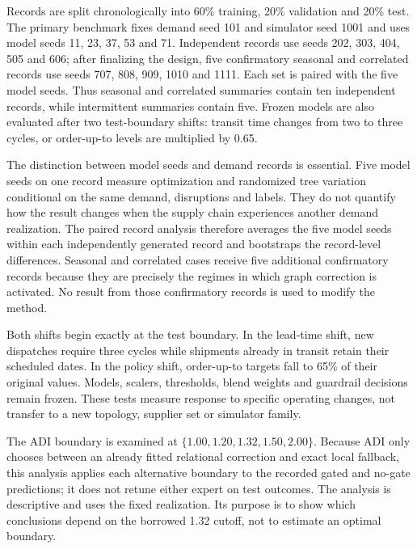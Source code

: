 \documentclass[11pt,a4paper]{article}
\begin{document}
Records are split chronologically into 60\% training, 20\% validation and 20\% test. The primary benchmark fixes demand seed 101 and simulator seed 1001 and uses model seeds 11, 23, 37, 53 and 71. Independent records use seeds 202, 303, 404, 505 and 606; after finalizing the design, five confirmatory seasonal and correlated records use seeds 707, 808, 909, 1010 and 1111. Each set is paired with the five model seeds. Thus seasonal and correlated summaries contain ten independent records, while intermittent summaries contain five. Frozen models are also evaluated after two test-boundary shifts: transit time changes from two to three cycles, or order-up-to levels are multiplied by 0.65.

The distinction between model seeds and demand records is essential. Five model seeds on one record measure optimization and randomized tree variation conditional on the same demand, disruptions and labels. They do not quantify how the result changes when the supply chain experiences another demand realization. The paired record analysis therefore averages the five model seeds within each independently generated record and bootstraps the record-level differences. Seasonal and correlated cases receive five additional confirmatory records because they are precisely the regimes in which graph correction is activated. No result from those confirmatory records is used to modify the method.

Both shifts begin exactly at the test boundary. In the lead-time shift, new dispatches require three cycles while shipments already in transit retain their scheduled dates. In the policy shift, order-up-to targets fall to 65\% of their original values. Models, scalers, thresholds, blend weights and guardrail decisions remain frozen. These tests measure response to specific operating changes, not transfer to a new topology, supplier set or simulator family.

The ADI boundary is examined at $\{1.00,1.20,1.32,1.50,2.00\}$. Because ADI only chooses between an already fitted relational correction and exact local fallback, this analysis applies each alternative boundary to the recorded gated and no-gate predictions; it does not retune either expert on test outcomes. The analysis is descriptive and uses the fixed realization. Its purpose is to show which conclusions depend on the borrowed 1.32 cutoff, not to estimate an optimal boundary.
\end{document}
